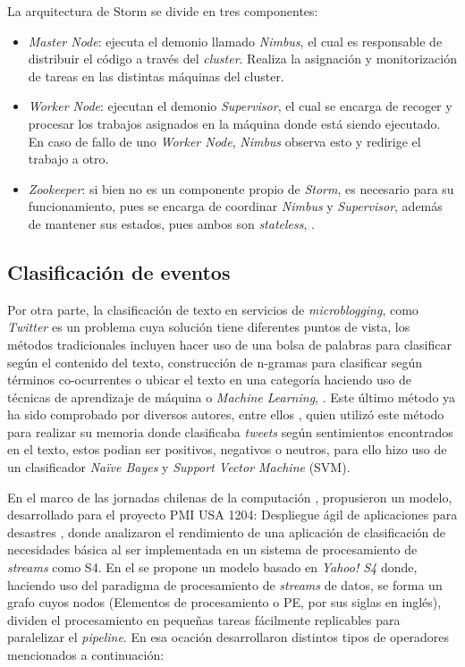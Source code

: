 La arquitectura de Storm se divide en tres componentes:

\begin{itemize}
\item \textit{Master Node}: ejecuta el demonio llamado \textit{Nimbus}, el cual es responsable de distribuir el código a través del \textit{cluster}. Realiza la asignación y monitorización de tareas en las distintas máquinas del cluster.
\item \textit{Worker Node}: ejecutan el demonio \textit{Supervisor}, el cual se encarga de recoger y procesar los trabajos asignados en la máquina donde está siendo ejecutado. En caso de fallo de uno \textit{Worker Node}, \textit{Nimbus} observa esto y redirige el trabajo a otro.
\item \textit{Zookeeper}: si bien no es un componente propio de \textit{Storm}, es necesario para su funcionamiento, pues se encarga de coordinar \textit{Nimbus} y \textit{Supervisor}, además de mantener sus estados, pues ambos son \textit{stateless}, \cite{HuntZookeeper}.
\end{itemize}	

\subsection{Clasificación de eventos}
\label{intro:ea:clasificacion}

Por otra parte, la clasificación de texto en servicios de \textit{microblogging}, como \textit{Twitter} es un problema cuya solución tiene diferentes puntos de vista, los métodos tradicionales incluyen hacer uso de una bolsa de palabras para clasificar según el contenido del texto, construcción de n-gramas para clasificar según términos co-ocurrentes o ubicar el texto en una categoría haciendo uso de técnicas de aprendizaje de máquina o \textit{Machine Learning}, \cite{EventDetection}. 
Este último método ya ha sido comprobado por diversos autores, entre ellos \cite{Maldonado}, quien utilizó este método para realizar su memoria donde clasificaba \textit{tweets} según sentimientos encontrados en el texto, estos podian ser positivos, negativos o neutros, para ello hizo uso de un clasificador \textit{Naïve Bayes} y \textit{Support Vector Machine} (SVM). 

En el marco de las jornadas chilenas de la computación \cite{WladdimiroPMI}, propusieron un modelo, desarrollado para el proyecto PMI USA 1204: Despliegue ágil de aplicaciones para desastres \cite{PMIProfes}, donde analizaron el rendimiento de una aplicación de clasificación de necesidades básica al ser implementada en un sistema de procesamiento de \textit{streams} como S4. En el se propone un modelo basado en \textit{Yahoo! S4} donde, haciendo uso del paradigma de procesamiento de \textit{streams} de datos, se forma un grafo cuyos nodos (Elementos de procesamiento o PE, por sus siglas en inglés), dividen el procesamiento en pequeñas tareas fácilmente replicables para paralelizar el \textit{pipeline}. En esa ocación desarrollaron distintos tipos de operadores mencionados a continuación:

